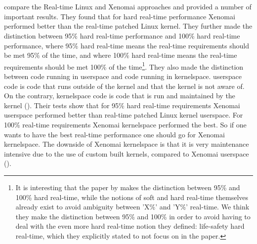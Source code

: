 \documentclass[12pt]{scrreprt}
\begin{document}
\\\\
\cite{brown_martin} compare the Real-time Linux and Xenomai approaches and provided a number of important results. They found that for hard real-time performance Xenomai performed better than the real-time patched Linux kernel. They further made the distinction between 95\% hard real-time performance and 100\% hard real-time performance, where 95\% hard real-time means the real-time requirements should be met 95\% of the time, and where 100\% hard real-time means the real-time requirements should be met 100\% of the time\footnote{It is interesting that the paper by \citeauthor{brown_martin} makes the distinction between 95\% and 100\% hard real-time, while the notions of soft and hard real-time themselves already exist to avoid ambiguity between 'X\%' and 'Y\%' real-time. We think they make the distinction between 95\% and 100\% in order to avoid having to deal with the even more hard real-time notion they defined: life-safety hard real-time, which they explicitly stated to not focus on in the paper.}. They also made the distinction between code running in userspace and code running in kernelspace. userspace code is code that runs outside of the kernel and that the kernel is not aware of. On the contrary, kernelspace code is code that is run and maintained by the kernel (\cite{blocking}). Their tests show that for 95\% hard real-time requirements Xenomai userspace performed better than real-time patched Linux kernel userspace. For 100\% real-time requirements Xenomai kernelspace performed the best. So if one wants to have the best real-time performance one should go for Xenomai kernelspace. The downside of Xenomai kernelspace is that it is very maintenance intensive due to the use of custom built kernels, compared to Xenomai userspace (\cite{brown_martin}).
\end{document}
